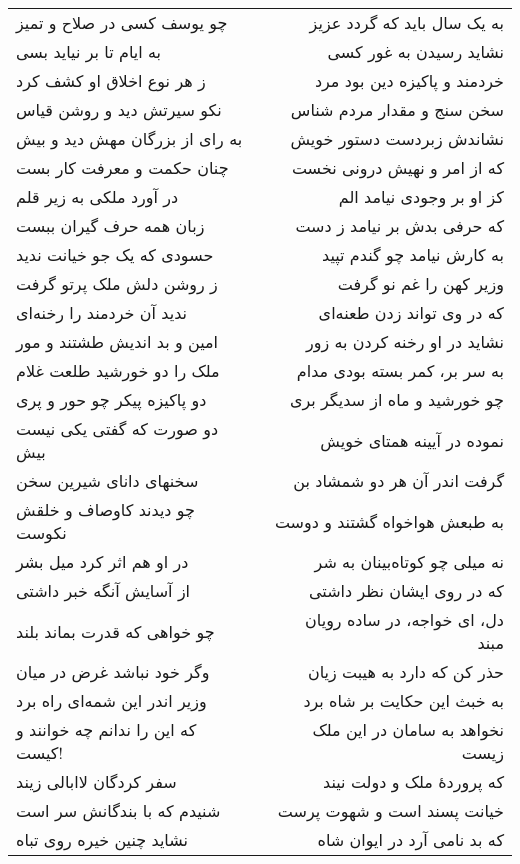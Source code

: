 \begin{center}
\begin{longtable}{l p{0.5cm} r}
\\
چو یوسف کسی در صلاح و تمیز
&&
به یک سال باید که گردد عزیز
\\
به ایام تا بر نیاید بسی
&&
نشاید رسیدن به غور کسی
\\
ز هر نوع اخلاق او کشف کرد
&&
خردمند و پاکیزه دین بود مرد
\\
نکو سیرتش دید و روشن قیاس
&&
سخن سنج و مقدار مردم شناس
\\
به رای از بزرگان مهش دید و بیش
&&
نشاندش زبردست دستور خویش
\\
چنان حکمت و معرفت کار بست
&&
که از امر و نهیش درونی نخست
\\
در آورد ملکی به زیر قلم
&&
کز او بر وجودی نیامد الم
\\
زبان همه حرف گیران ببست
&&
که حرفی بدش بر نیامد ز دست
\\
حسودی که یک جو خیانت ندید
&&
به کارش نیامد چو گندم تپید
\\
ز روشن دلش ملک پرتو گرفت
&&
وزیر کهن را غم نو گرفت
\\
ندید آن خردمند را رخنه‌ای
&&
که در وی تواند زدن طعنه‌ای
\\
امین و بد اندیش طشتند و مور
&&
نشاید در او رخنه کردن به زور
\\
ملک را دو خورشید طلعت غلام
&&
به سر بر، کمر بسته بودی مدام
\\
دو پاکیزه پیکر چو حور و پری
&&
چو خورشید و ماه از سدیگر بری
\\
دو صورت که گفتی یکی نیست بیش
&&
نموده در آیینه همتای خویش
\\
سخنهای دانای شیرین سخن
&&
گرفت اندر آن هر دو شمشاد بن
\\
چو دیدند کاوصاف و خلقش نکوست
&&
به طبعش هواخواه گشتند و دوست
\\
در او هم اثر کرد میل بشر
&&
نه میلی چو کوتاه‌بینان به شر
\\
از آسایش آنگه خبر داشتی
&&
که در روی ایشان نظر داشتی
\\
چو خواهی که قدرت بماند بلند
&&
دل، ای خواجه، در ساده رویان مبند
\\
وگر خود نباشد غرض در میان
&&
حذر کن که دارد به هیبت زیان
\\
وزیر اندر این شمه‌ای راه برد
&&
به خبث این حکایت بر شاه برد
\\
که این را ندانم چه خوانند و کیست!
&&
نخواهد به سامان در این ملک زیست
\\
سفر کردگان لاابالی زیند
&&
که پروردهٔ ملک و دولت نیند
\\
شنیدم که با بندگانش سر است
&&
خیانت پسند است و شهوت پرست
\\
نشاید چنین خیره روی تباه
&&
که بد نامی آرد در ایوان شاه

\end{longtable}
\end{center}
